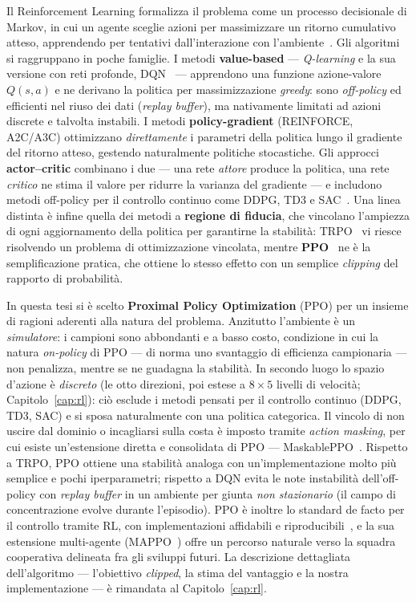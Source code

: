 Il Reinforcement Learning formalizza il problema come un processo decisionale di Markov, in
cui un agente sceglie azioni per massimizzare un ritorno cumulativo atteso, apprendendo per
tentativi dall'interazione con l'ambiente~\citep{sutton_barto}. Gli algoritmi si raggruppano
in poche famiglie. I metodi \textbf{value-based} --- \emph{Q-learning} e la sua versione con
reti profonde, DQN~\citep{dqn} --- apprendono una funzione azione-valore $Q(s,a)$ e ne
derivano la politica per massimizzazione \emph{greedy}: sono \emph{off-policy} ed efficienti
nel riuso dei dati (\emph{replay buffer}), ma nativamente limitati ad azioni discrete e
talvolta instabili. I metodi \textbf{policy-gradient} (REINFORCE, A2C/A3C) ottimizzano
\emph{direttamente} i parametri della politica lungo il gradiente del ritorno atteso,
gestendo naturalmente politiche stocastiche. Gli approcci \textbf{actor--critic} combinano i
due --- una rete \emph{attore} produce la politica, una rete \emph{critico} ne stima il
valore per ridurre la varianza del gradiente --- e includono metodi off-policy per il
controllo continuo come DDPG, TD3 e SAC~\citep{sac}. Una linea distinta \`e infine quella dei
metodi a \textbf{regione di fiducia}, che vincolano l'ampiezza di ogni aggiornamento della
politica per garantirne la stabilit\`a: TRPO~\citep{trpo} vi riesce risolvendo un problema di
ottimizzazione vincolata, mentre \textbf{PPO}~\citep{ppo} ne \`e la semplificazione pratica,
che ottiene lo stesso effetto con un semplice \emph{clipping} del rapporto di probabilit\`a.

In questa tesi si \`e scelto \textbf{Proximal Policy Optimization} (PPO) per un insieme di
ragioni aderenti alla natura del problema. Anzitutto l'ambiente \`e un \emph{simulatore}: i
campioni sono abbondanti e a basso costo, condizione in cui la natura \emph{on-policy} di PPO
--- di norma uno svantaggio di efficienza campionaria --- non penalizza, mentre se ne
guadagna la stabilit\`a. In secondo luogo lo spazio d'azione \`e \emph{discreto} (le otto
direzioni, poi estese a $8\times5$ livelli di velocit\`a; Capitolo~\ref{cap:rl}): ci\`o
esclude i metodi pensati per il controllo continuo (DDPG, TD3, SAC) e si sposa naturalmente
con una politica categorica. Il vincolo di non uscire dal dominio o incagliarsi sulla costa
\`e imposto tramite \emph{action masking}, per cui esiste un'estensione diretta e consolidata
di PPO --- MaskablePPO~\citep{maskable_ppo}. Rispetto a TRPO, PPO ottiene una stabilit\`a
analoga con un'implementazione molto pi\`u semplice e pochi iperparametri; rispetto a DQN
evita le note instabilit\`a dell'off-policy con \emph{replay buffer} in un ambiente per
giunta \emph{non stazionario} (il campo di concentrazione evolve durante l'episodio). PPO \`e
inoltre lo standard de facto per il controllo tramite RL, con implementazioni affidabili e
riproducibili~\citep{sb3}, e la sua estensione multi-agente (MAPPO~\citep{mappo}) offre un
percorso naturale verso la squadra cooperativa delineata fra gli sviluppi futuri. La
descrizione dettagliata dell'algoritmo --- l'obiettivo \emph{clipped}, la stima del vantaggio
e la nostra implementazione --- \`e rimandata al Capitolo~\ref{cap:rl}.

